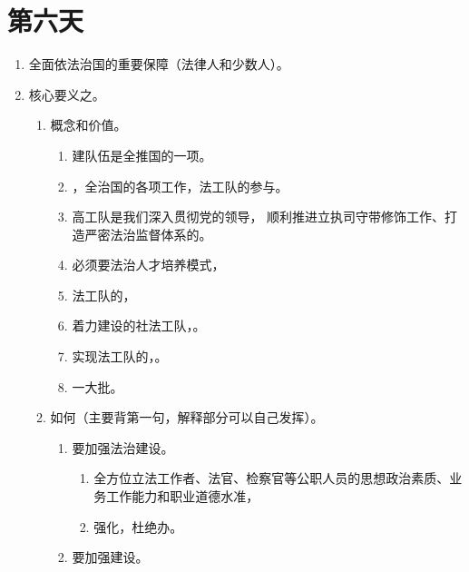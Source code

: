 \section{第六天}
\begin{enumerate}
  \item 全面依法治国的重要保障（法律人和少数人）。
  \item 核心要义之。
        \begin{enumerate}
          \item 概念和价值。
                \begin{enumerate}
                  \item 建队伍是全推国的一项。
                  \item {}，全治国的各项工作，法工队的参与。
                  \item 高工队是我们深入贯彻党的领导，
                        顺利推进立执司守带修饰工作、打造严密法治监督体系的。
                  \item 必须要法治人才培养模式，
                  \item {}法工队的，
                  \item 着力建设的社法工队，。
                  \item 实现法工队的，。
                  \item {}一大批。
                \end{enumerate}
          \item 如何（主要背第一句，解释部分可以自己发挥）。
                \begin{enumerate}
                  \item 要加强法治建设。
                        \begin{enumerate}
                          \item 全方位立法工作者、法官、检察官等公职人员的思想政治素质、业务工作能力和职业道德水准，
                          \item 强化，杜绝办。
                        \end{enumerate}
                  \item 要加强建设。

\end{enumerate}
\end{enumerate}
\end{enumerate}
